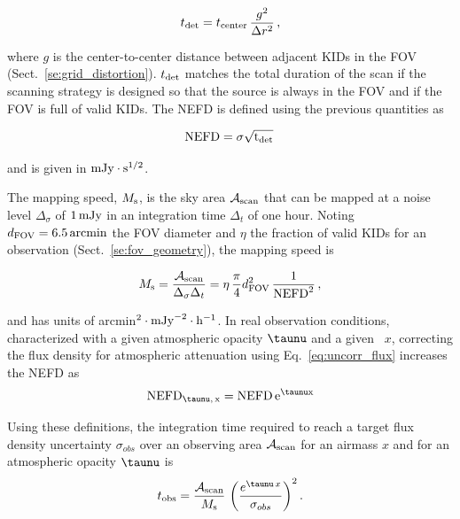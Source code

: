 \begin{equation}
  t_{\rm{det}} = t_{\rm{center}}\, \frac{g^2}{\Delta r^2}\,,
\label{eq:t_det}
\end{equation}

where $g$ is the center-to-center distance between adjacent KIDs in the FOV
(Sect.~\ref{se:grid_distortion}). $t_{\rm{det}}$ matches the total duration of
the scan if the scanning strategy is designed so that the source is always in
the FOV and if the FOV is full of valid KIDs. The NEFD is defined
using the previous quantities as 

\begin{equation}
  \rm{NEFD} = \sigma \sqrt{t_{\rm{det}}}\, 
\label{eq:nefd_def}
\end{equation}

and is given in $\rm{mJy}\cdot s^{1/2}$.

The mapping speed, $M_{\rm{s}}$, is the sky area $\mathcal{A}_{\rm{scan}}$ that
can be mapped at a noise level $\Delta_\sigma$ of $1\,\rm{mJy}$ in an
integration time $\Delta_t$ of one hour. Noting $d_{\rm{FOV}} =
6.5\,\rm{arcmin}$ the FOV diameter and $\eta$ the fraction of valid KIDs for an
observation (Sect.~\ref{se:fov_geometry}), the mapping speed is

\begin{equation}
M_{\rm{s}} = \frac{\mathcal{A}_{\rm{scan}}}{\Delta_\sigma\Delta_t} = 
\eta \, \frac{\pi}{4} d_{\rm{FOV}}^2 \, \frac{1}{\rm{NEFD}^2}\, ,
\label{eq:mapping_speed}
\end{equation}

and has units of arcmin$^2 \cdot \rm{mJy}^{-2} \cdot \rm{h}^{-1}$. 
In real observation conditions, characterized with a given atmospheric
opacity $\taunu$ and a given \airmass\ $x$, correcting the flux
density for atmospheric attenuation using Eq.~\ref{eq:uncorr_flux}   
increases the NEFD as 
\begin{equation}
\rm{NEFD}_{\taunu,\, x} = \rm{NEFD}\, e^{\taunu x}
\label{eq:nefd_tau_el}
\end{equation}

Using these definitions, the integration time required to reach a target flux
density uncertainty $\sigma_{obs}$ over an observing area
$\mathcal{A}_{\rm{scan}}$ for an airmass $x$ and for an atmospheric opacity $\taunu$ is
\begin{equation}
  t_{\rm{obs}} = \frac{\mathcal{A}_{\rm{scan}}}{ M_{\rm{s}}} \, \left(\frac{e^{\taunu\, x}}{\sigma_{obs}}\right)^2.
\end{equation}

